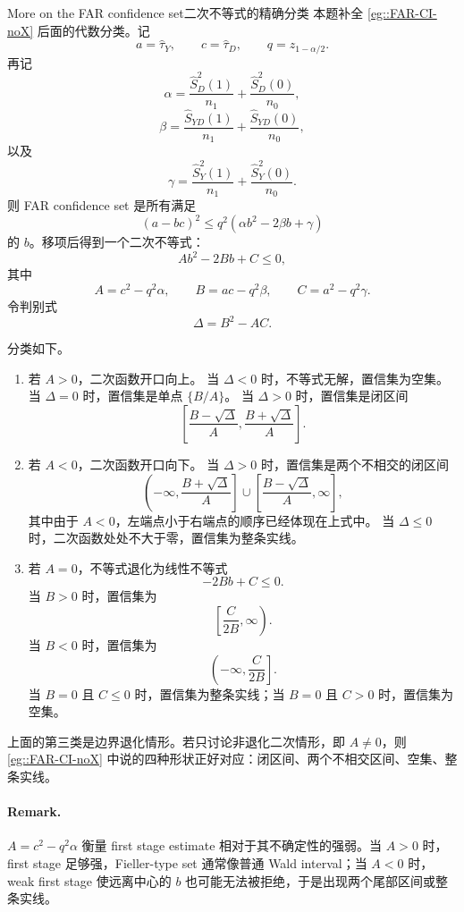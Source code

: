 \begin{exercisesolution}{More on the FAR confidence set}{二次不等式的精确分类}
本题补全 \cref{eg::FAR-CI-noX} 后面的代数分类。记
\[
a=\hat{\tau}_Y,\qquad c=\hat{\tau}_D,\qquad q=z_{1-\alpha/2}.
\]
再记
\[
\alpha
=
\frac{\hat{S}_D^2(1)}{n_1}
+\frac{\hat{S}_D^2(0)}{n_0},
\]
\[
\beta
=
\frac{\hat{S}_{YD}(1)}{n_1}
+\frac{\hat{S}_{YD}(0)}{n_0},
\]
以及
\[
\gamma
=
\frac{\hat{S}_Y^2(1)}{n_1}
+\frac{\hat{S}_Y^2(0)}{n_0}.
\]
则 FAR confidence set 是所有满足
\[
(a-bc)^2
\leq
q^2(\alpha b^2-2\beta b+\gamma)
\]
的 $b$。移项后得到一个二次不等式：
\[
Ab^2-2Bb+C\leq0,
\]
其中
\[
A=c^2-q^2\alpha,\qquad
B=ac-q^2\beta,\qquad
C=a^2-q^2\gamma.
\]
令判别式
\[
\Delta=B^2-AC.
\]

分类如下。

\begin{enumerate}
\item
若 $A>0$，二次函数开口向上。
当 $\Delta<0$ 时，不等式无解，置信集为空集。
当 $\Delta=0$ 时，置信集是单点 $\{B/A\}$。
当 $\Delta>0$ 时，置信集是闭区间
\[
\left[
\frac{B-\sqrt{\Delta}}{A},
\frac{B+\sqrt{\Delta}}{A}
\right].
\]

\item
若 $A<0$，二次函数开口向下。
当 $\Delta>0$ 时，置信集是两个不相交的闭区间
\[
\left(-\infty,\frac{B+\sqrt{\Delta}}{A}\right]
\cup
\left[\frac{B-\sqrt{\Delta}}{A},\infty\right],
\]
其中由于 $A<0$，左端点小于右端点的顺序已经体现在上式中。
当 $\Delta\leq0$ 时，二次函数处处不大于零，置信集为整条实线。

\item
若 $A=0$，不等式退化为线性不等式
\[
-2Bb+C\leq0.
\]
当 $B>0$ 时，置信集为
\[
\left[\frac{C}{2B},\infty\right).
\]
当 $B<0$ 时，置信集为
\[
\left(-\infty,\frac{C}{2B}\right].
\]
当 $B=0$ 且 $C\leq0$ 时，置信集为整条实线；当 $B=0$ 且 $C>0$ 时，置信集为空集。
\end{enumerate}

上面的第三类是边界退化情形。若只讨论非退化二次情形，即 $A\neq0$，则 \cref{eg::FAR-CI-noX} 中说的四种形状正好对应：闭区间、两个不相交区间、空集、整条实线。

\paragraph{Remark.}
$A=c^2-q^2\alpha$ 衡量 first stage estimate 相对于其不确定性的强弱。当 $A>0$ 时，first stage 足够强，Fieller-type set 通常像普通 Wald interval；当 $A<0$ 时，weak first stage 使远离中心的 $b$ 也可能无法被拒绝，于是出现两个尾部区间或整条实线。
\end{exercisesolution}

